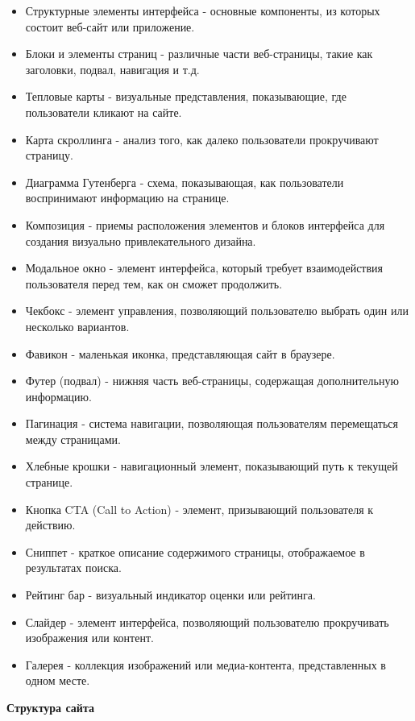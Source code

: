 \begin{itemize}
    \item Структурные элементы интерфейса - основные компоненты, из которых состоит веб-сайт или приложение.
    \item Блоки и элементы страниц - различные части веб-страницы, такие как заголовки, подвал, навигация и т.д.
    \item Тепловые карты - визуальные представления, показывающие, где пользователи кликают на сайте.
    \item Карта скроллинга - анализ того, как далеко пользователи прокручивают страницу.
    \item Диаграмма Гутенберга - схема, показывающая, как пользователи воспринимают информацию на странице.
    \item Композиция - приемы расположения элементов и блоков интерфейса для создания визуально привлекательного дизайна.
    \item Модальное окно - элемент интерфейса, который требует взаимодействия пользователя перед тем, как он сможет продолжить.
    \item Чекбокс - элемент управления, позволяющий пользователю выбрать один или несколько вариантов.
    \item Фавикон - маленькая иконка, представляющая сайт в браузере.
    \item Футер (подвал) - нижняя часть веб-страницы, содержащая дополнительную информацию.
    \item Пагинация - система навигации, позволяющая пользователям перемещаться между страницами.
    \item Хлебные крошки - навигационный элемент, показывающий путь к текущей странице.
    \item Кнопка CTA (Call to Action) - элемент, призывающий пользователя к действию.
    \item Сниппет - краткое описание содержимого страницы, отображаемое в результатах поиска.
    \item Рейтинг бар - визуальный индикатор оценки или рейтинга.
    \item Слайдер - элемент интерфейса, позволяющий пользователю прокручивать изображения или контент.
    \item Галерея - коллекция изображений или медиа-контента, представленных в одном месте.
\end{itemize}
\bigskip

\textbf{Структура сайта}
\bigskip

\noindent
\begin{minipage}{\linewidth}
\end{minipage}
\bigskip

